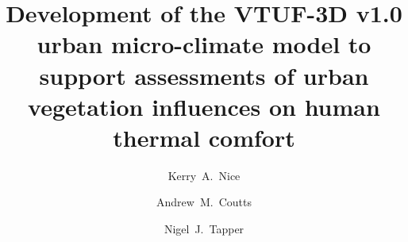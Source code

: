 \documentclass[final,3p,times,authoryear]{elsarticle}
\begin{document}
\begin{frontmatter}



\title{Development of the VTUF-3D v1.0 urban micro-climate model to support assessments of urban vegetation influences on human thermal comfort}


\author[monash,melb,crc]{Kerry~A.~Nice}
\author[monash,crc]{Andrew~M.~Coutts}
\author[monash,crc]{Nigel~J.~Tapper}
\address[monash]{School of Earth, Atmosphere and Environment, Monash University, Clayton, Victoria 3800, Australia}
\address[melb]{Transport, Health, and Urban Design Hub, Faculty of Architecture, Building, and Planning, University of Melbourne, Victoria 3010, Australia}
\address[crc]{Cooperative Research Centre for Water Sensitive Cities, Melbourne, Australia}


\begin{abstract}


\end{abstract}
\end{frontmatter}
\end{document}
